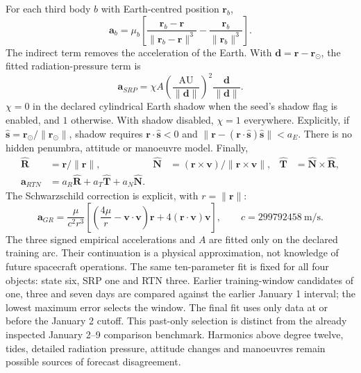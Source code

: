 For each third body $b$ with Earth-centred position $\mathbf r_b$,
\begin{equation}
\mathbf a_b=\mu_b\left[
\frac{\mathbf r_b-\mathbf r}{\|\mathbf r_b-\mathbf r\|^3}
-\frac{\mathbf r_b}{\|\mathbf r_b\|^3}\right].
\end{equation}
The indirect term removes the acceleration of the Earth. With $\mathbf d=\mathbf
r-\mathbf r_\odot$, the fitted radiation-pressure term is
\begin{equation}
\mathbf a_{SRP}=\chi A\left(\frac{\mathrm{AU}}{\|\mathbf d\|}\right)^2
\frac{\mathbf d}{\|\mathbf d\|}.
\end{equation}
$\chi=0$ in the declared cylindrical Earth shadow when the seed's shadow flag is
enabled, and $1$ otherwise. With shadow disabled, $\chi=1$ everywhere. Explicitly,
if $\hat{\mathbf s}=\mathbf r_\odot/\|\mathbf r_\odot\|$, shadow requires
$\mathbf r\cdot\hat{\mathbf s}<0$ and
$\|\mathbf r-(\mathbf r\cdot\hat{\mathbf s})\hat{\mathbf s}\|<a_E$.
There is no hidden penumbra, attitude or manoeuvre model.
Finally,
\begin{align}
\hat{\mathbf R}&=\mathbf r/\|\mathbf r\|,&
\hat{\mathbf N}&=(\mathbf r\times\mathbf v)/\|\mathbf r\times\mathbf v\|,&
\hat{\mathbf T}&=\hat{\mathbf N}\times\hat{\mathbf R},\\
\mathbf a_{RTN}&=a_R\hat{\mathbf R}+a_T\hat{\mathbf T}+a_N\hat{\mathbf N}.
\end{align}
The Schwarzschild correction is explicit, with $r=\|\mathbf r\|$:
\begin{equation}
\mathbf a_{GR}=\frac{\mu}{c^2r^3}
\left[\left(\frac{4\mu}{r}-\mathbf v\cdot\mathbf v\right)\mathbf r
+4(\mathbf r\cdot\mathbf v)\mathbf v\right],\qquad c=299792458\ \mathrm{m/s}.
\end{equation}
The three signed empirical accelerations and $A$ are fitted only on the declared
training arc. Their continuation is a physical approximation, not knowledge of
future spacecraft operations. The same ten-parameter fit is fixed for all four
objects: state six, SRP one and RTN three. Earlier training-window candidates
of one, three and seven days are compared against the earlier January 1
interval; the lowest maximum error selects the window. The final fit uses
only data at or before the January 2 cutoff. This past-only selection is
distinct from the already inspected January 2--9 comparison benchmark.
Harmonics above degree twelve, tides, detailed radiation pressure, attitude
changes and manoeuvres remain possible sources of forecast disagreement.

